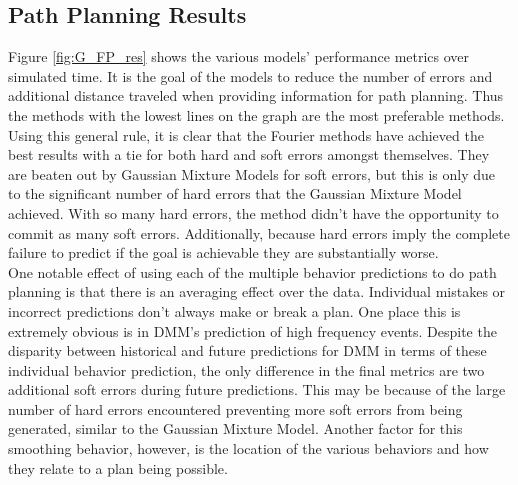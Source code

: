 \begin{table}[htb!]
  \centering
  \caption{Future Path Planning Results}
  \label{table:Future_Path_Planning_Results}
\end{table}




\subsection{ Path Planning Results }

Figure \ref{fig:G_FP_res} shows the various models' performance metrics over
simulated time. It is the goal of the models to reduce the number of errors
and additional distance traveled when providing information for path planning.
Thus the methods with the lowest lines on the graph are the most
preferable methods. Using this general rule, it is clear that the Fourier
methods have achieved the best results with a tie for both hard and soft errors
amongst themselves. They are beaten out by Gaussian Mixture Models for soft
errors, but this is only due to the significant number of hard errors that
the Gaussian Mixture Model achieved. With so many hard errors, the method
didn't have the opportunity to commit as many soft errors. Additionally,
because hard errors imply the complete failure to predict if the goal is
achievable they are substantially worse. \\

One notable effect of using each of the multiple behavior predictions to do path
planning is that there is an averaging effect over the data. Individual mistakes
or incorrect predictions don't always make or break a plan. One place this is
extremely obvious is in DMM's prediction of high frequency events.
Despite the disparity between historical and future predictions for DMM in
terms of these individual behavior prediction, the only difference in the final
metrics are two additional soft errors during future predictions. This may be
because of the large number of hard errors encountered preventing more
soft errors from being generated, similar to the Gaussian Mixture Model.
Another factor for this smoothing behavior, however, is the location of the
various behaviors and how they relate to a plan being possible. \\

